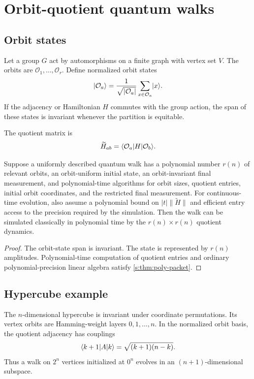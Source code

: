 \section{Orbit-quotient quantum walks}
\label{s:ch:orbit-quotients}

\subsection{Orbit states}
Let a group $G$ act by automorphisms on a finite graph with vertex set $V$. The orbits are $\mathcal O_1,\ldots,\mathcal O_r$. Define normalized orbit states
\[
\lvert \mathcal O_a\rangle
=
\frac1{\sqrt{|\mathcal O_a|}}
\sum_{x\in\mathcal O_a}\lvert x\rangle.
\]
If the adjacency or Hamiltonian $H$ commutes with the group action, the span of these states is invariant whenever the partition is equitable.

The quotient matrix is
\[
\widetilde H_{ab}
=
\langle \mathcal O_a\rvert H\lvert \mathcal O_b\rangle.
\]

\begin{theorem}
\label{s:thm:orbit-collapse}
Suppose a uniformly described quantum walk has a polynomial number $r(n)$ of relevant orbits, an orbit-uniform initial state, an orbit-invariant final measurement, and polynomial-time algorithms for orbit sizes, quotient entries, initial orbit coordinates, and the restricted final measurement. For continuous-time evolution, also assume a polynomial bound on $|t|\|\widetilde H\|$ and efficient entry access to the precision required by the simulation. Then the walk can be simulated classically in polynomial time by the $r(n)\times r(n)$ quotient dynamics.
\end{theorem}

\begin{proof}
The orbit-state span is invariant. The state is represented by $r(n)$ amplitudes. Polynomial-time computation of quotient entries and ordinary polynomial-precision linear algebra satisfy \cref{s:thm:poly-packet}.
\end{proof}

\subsection{Hypercube example}
The $n$-dimensional hypercube is invariant under coordinate permutations. Its vertex orbits are Hamming-weight layers $0,1,\ldots,n$. In the normalized orbit basis, the quotient adjacency has couplings
\begin{equation}
\langle k+1\rvert A\lvert k\rangle
=
\sqrt{(k+1)(n-k)}.
\label{s:eq:hypercube-coupling}
\end{equation}
Thus a walk on $2^n$ vertices initialized at $0^n$ evolves in an $(n+1)$-dimensional subspace.

